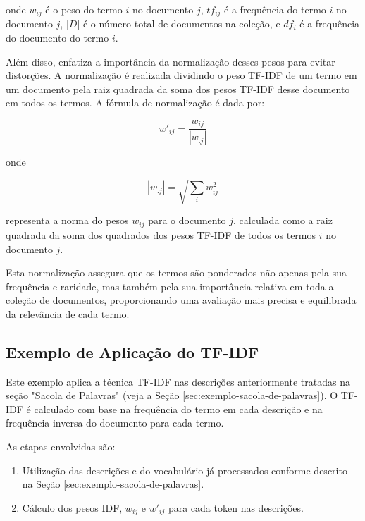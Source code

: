 onde \( w_{ij} \) é o peso do termo \( i \) no documento \( j \), \( tf_{ij} \) é a frequência do termo \( i \) no documento \( j \), \( |D| \) é o número total de documentos na coleção, e \( df_i \) é a frequência do documento do termo \( i \).

Além disso, \cite{salton1988term} enfatiza a importância da normalização desses pesos para evitar distorções. A normalização é realizada dividindo o peso TF-IDF de um termo em um documento pela raiz quadrada da soma dos pesos TF-IDF desse documento em todos os termos. A fórmula de normalização é dada por:

\begin{equation}
    w'_{ij} = \frac{w_{ij}}{|w_{.j}|}
\end{equation}

onde

\begin{equation}
    |w_{.j}| = \sqrt{\sum_{i}{w_{ij}^2}}
\end{equation}

representa a norma do pesos $w_{ij}$ para o documento \( j \), calculada como a raiz quadrada da soma dos quadrados dos pesos TF-IDF de todos os termos \( i \) no documento \( j \).

Esta normalização assegura que os termos são ponderados não apenas pela sua frequência e raridade, mas também pela sua importância relativa em toda a coleção de documentos, proporcionando uma avaliação mais precisa e equilibrada da relevância de cada termo.

\subsection{Exemplo de Aplicação do TF-IDF}
\label{sec:exemplo-tfidf}
Este exemplo aplica a técnica TF-IDF nas descrições anteriormente tratadas na seção "Sacola de Palavras" (veja a Seção \ref{sec:exemplo-sacola-de-palavras}). O TF-IDF é calculado com base na frequência do termo em cada descrição e na frequência inversa do documento para cada termo.

As etapas envolvidas são:

\begin{enumerate}
    \item Utilização das descrições e do vocabulário já processados conforme descrito na Seção \ref{sec:exemplo-sacola-de-palavras}.
    \item Cálculo dos pesos IDF, \( w_{ij} \) e \( w'_{ij} \) para cada token nas descrições.
\end{enumerate}

